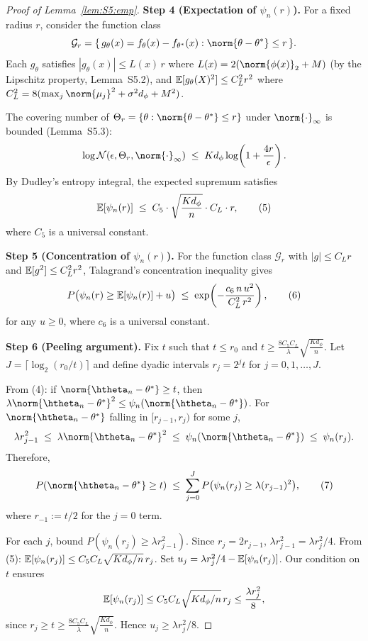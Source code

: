 \begin{proof}[Proof of Lemma~\ref{lem:S5:emp}]
\noindent\textbf{Step 4 (Expectation of $\psi_n(r)$).}
For a fixed radius $r$, consider the function class
\[
\mathcal{G}_r=\{\,g_\theta(x)=f_\theta(x)-f_{\theta^*}(x):
               \norm{\theta-\theta^*}\le r\,\}.
\]
Each $g_\theta$ satisfies $|g_\theta(x)|\le L(x)\,r$ where
$L(x)=2(\norm{\phi(x)}_2+M)$ (by the Lipschitz property,
Lemma~S5.2), and $\mathbb{E}[g_\theta(X)^2]\le C_L^2 r^2$ where
$C_L^2=8(\max_j\norm{\mu_j}^2+\sigma^2 d_\phi+M^2)$.

The covering number of $\Theta_r=\{\theta:\norm{\theta-\theta^*}\le r\}$
under $\norm{\cdot}_\infty$ is bounded (Lemma~S5.3):
\[
\log\mathcal{N}(\epsilon,\Theta_r,\norm{\cdot}_\infty)
\;\le\; K d_\phi\log\!\left(1+\frac{4r}{\epsilon}\right).
\]
By Dudley's entropy integral, the expected supremum satisfies
\begin{equation}
\mathbb{E}[\psi_n(r)]
\;\le\; C_5\cdot\sqrt{\frac{K d_\phi}{n}}\cdot C_L\cdot r,
\tag{5}
\end{equation}
where $C_5$ is a universal constant.

\noindent\textbf{Step 5 (Concentration of $\psi_n(r)$).}
For the function class $\mathcal{G}_r$ with $|g|\le C_L r$ and
$\mathbb{E}[g^2]\le C_L^2 r^2$, Talagrand's concentration inequality gives
\begin{equation}
P\bigl(\psi_n(r)\ge\mathbb{E}[\psi_n(r)]+u\bigr)
\;\le\; \exp\!\left(-\frac{c_6\,n\,u^2}{C_L^2\,r^2}\right),
\tag{6}
\end{equation}
for any $u\ge0$, where $c_6$ is a universal constant.

\noindent\textbf{Step 6 (Peeling argument).}
Fix $t$ such that $t\le r_0$ and
$t\ge\frac{8C_5 C_L}{\lambda}\sqrt{\frac{K d_\phi}{n}}$.
Let $J=\lceil\log_2(r_0/t)\rceil$ and define dyadic intervals
$r_j=2^j t$ for $j=0,1,\dots,J$.

From (4): if $\norm{\htheta_n-\theta^*}\ge t$, then
$\lambda\norm{\htheta_n-\theta^*}^2\le\psi_n(\norm{\htheta_n-\theta^*})$.
For $\norm{\htheta_n-\theta^*}$ falling in $[r_{j-1},r_j)$ for some $j$,
\[
\lambda r_{j-1}^2 \;\le\; \lambda\norm{\htheta_n-\theta^*}^2
\;\le\; \psi_n(\norm{\htheta_n-\theta^*}) \;\le\; \psi_n(r_j).
\]
Therefore,
\begin{equation}
P(\norm{\htheta_n-\theta^*}\ge t)
\;\le\; \sum_{j=0}^J P\bigl(\psi_n(r_j)\ge\lambda (r_{j-1})^2\bigr),
\tag{7}
\end{equation}
where $r_{-1}:=t/2$ for the $j=0$ term.

For each $j$, bound $P(\psi_n(r_j)\ge\lambda r_{j-1}^2)$.
Since $r_j=2r_{j-1}$, $\lambda r_{j-1}^2=\lambda r_j^2/4$.
From (5): $\mathbb{E}[\psi_n(r_j)]\le C_5 C_L\sqrt{K d_\phi/n}\,r_j$.
Set $u_j=\lambda r_j^2/4-\mathbb{E}[\psi_n(r_j)]$.  Our condition on $t$ ensures
\[
\mathbb{E}[\psi_n(r_j)]\le C_5 C_L\sqrt{K d_\phi/n}\,r_j
\le\frac{\lambda r_j^2}{8},
\]
since $r_j\ge t\ge\frac{8C_5 C_L}{\lambda}\sqrt{\frac{K d_\phi}{n}}$.
Hence $u_j\ge\lambda r_j^2/8$.


\end{proof}

